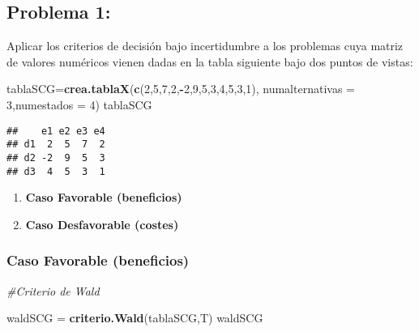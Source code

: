 \documentclass[
]{article}
\newenvironment{Shaded}{\begin{snugshade}}{\end{snugshade}}
\newcommand{\AttributeTok}[1]{\textcolor[rgb]{0.13,0.29,0.53}{#1}}
\newcommand{\CommentTok}[1]{\textcolor[rgb]{0.56,0.35,0.01}{\textit{#1}}}
\newcommand{\DecValTok}[1]{\textcolor[rgb]{0.00,0.00,0.81}{#1}}
\newcommand{\FunctionTok}[1]{\textcolor[rgb]{0.13,0.29,0.53}{\textbf{#1}}}
\newcommand{\NormalTok}[1]{#1}
\newcommand{\OtherTok}[1]{\textcolor[rgb]{0.56,0.35,0.01}{#1}}
\newcommand{\SpecialCharTok}[1]{\textcolor[rgb]{0.81,0.36,0.00}{\textbf{#1}}}
\providecommand{\tightlist}{%
  \setlength{\itemsep}{0pt}\setlength{\parskip}{0pt}}
\begin{document}
\subsection{Problema 1:}\label{problema-1-1}

Aplicar los criterios de decisión bajo incertidumbre a los problemas
cuya matriz de valores numéricos vienen dadas en la tabla siguiente bajo
dos puntos de vistas:

\begin{Shaded}
\begin{Highlighting}[]
\NormalTok{tablaSCG}\OtherTok{=}\FunctionTok{crea.tablaX}\NormalTok{(}\FunctionTok{c}\NormalTok{(}\DecValTok{2}\NormalTok{,}\DecValTok{5}\NormalTok{,}\DecValTok{7}\NormalTok{,}\DecValTok{2}\NormalTok{,}\SpecialCharTok{{-}}\DecValTok{2}\NormalTok{,}\DecValTok{9}\NormalTok{,}\DecValTok{5}\NormalTok{,}\DecValTok{3}\NormalTok{,}\DecValTok{4}\NormalTok{,}\DecValTok{5}\NormalTok{,}\DecValTok{3}\NormalTok{,}\DecValTok{1}\NormalTok{), }\AttributeTok{numalternativas =} \DecValTok{3}\NormalTok{,}\AttributeTok{numestados =} \DecValTok{4}\NormalTok{)}
\NormalTok{tablaSCG}
\end{Highlighting}
\end{Shaded}

\begin{verbatim}
##    e1 e2 e3 e4
## d1  2  5  7  2
## d2 -2  9  5  3
## d3  4  5  3  1
\end{verbatim}

\begin{enumerate}
\def\labelenumi{\arabic{enumi})}
\tightlist
\item
  \textbf{Caso Favorable (beneficios)}
\item
  \textbf{Caso Desfavorable (costes)}
\end{enumerate}

\subsubsection{Caso Favorable
(beneficios)}\label{caso-favorable-beneficios}

\begin{Shaded}
\begin{Highlighting}[]
\CommentTok{\#Criterio de Wald}

\NormalTok{waldSCG }\OtherTok{=} \FunctionTok{criterio.Wald}\NormalTok{(tablaSCG,T)}
\NormalTok{waldSCG}
\end{Highlighting}
\end{Shaded}
\end{document}
